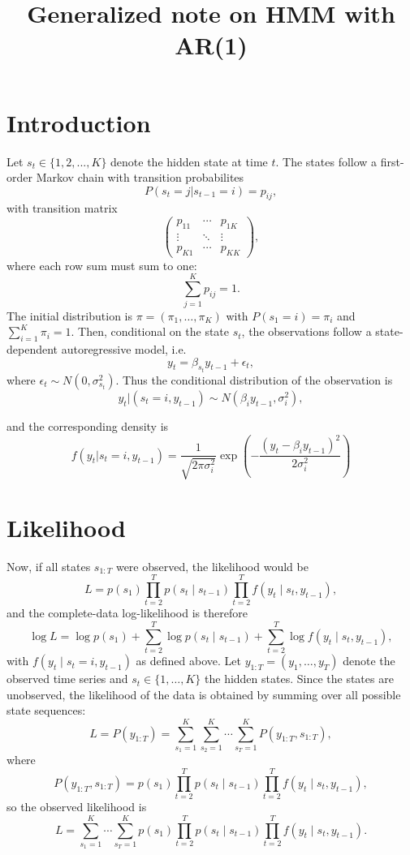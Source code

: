 \documentclass[11pt]{article}
\title{Generalized note on HMM with AR(1)}
\begin{document}
\maketitle	
\pagebreak



\section{Introduction}

Let $s_t\in \{1, 2, ..., K\}$ denote the hidden state at time $t$. The states 
follow a first-order Markov chain with transition probabilites 
$$
P(s_t=j\vert s_{t-1}=i) = p_{ij},
$$
with transition matrix
$$
\begin{pmatrix}
    p_{11} & \cdots & p_{1K}\\
    \vdots & \ddots & \vdots \\
    p_{K1} & \cdots & p_{KK}
\end{pmatrix},
$$
where each row sum must sum to one:
$$
\sum_{j=1}^K p_{ij} = 1.
$$
The initial distribution is $\pi=(\pi_1, \ldots, \pi_K)$ with $P(s_1=i)=\pi_i$
and $\sum_{i=1}^K \pi_i = 1$. Then, conditional on the state $s_t$, the observations
follow a state-dependent autoregressive model, i.e.
$$
y_t = \beta_{s_t}y_{t-1} + \epsilon_t, 
$$
where $\epsilon_t \sim N(0, \sigma^2_{s_t})$. Thus the conditional distribution of
the observation is 
$$
y_t \vert (s_t=i, y_{t-1}) \sim N(\beta_i y_{t-1}, \sigma^2_i),
$$

and the corresponding density is 
$$
f(y_t \vert s_t = i, y_{t-1}) = \frac{1}{\sqrt{2\pi \sigma^2_i}} 
\operatorname{exp}\left(- \frac{(y_t - \beta_i y_{t-1})^2}{2\sigma^2_i}\right)
$$

\section{Likelihood}
Now, if all states $s_{1:T}$ were observed, the likelihood would be
$$
L = p(s_1)\prod_{t=2}^T p(s_t \mid s_{t-1}) \prod_{t=2}^T f(y_t \mid s_t, y_{t-1}),
$$
and the complete-data log-likelihood is therefore
$$
\log L = \log p(s_1) + \sum_{t=2}^T \log p(s_t \mid s_{t-1}) + \sum_{t=2}^T \log f(y_t \mid s_t, y_{t-1}),
$$
with $f(y_t \mid s_t = i, y_{t-1})$ as defined above. Let $y_{1:T} = (y_1, \ldots, y_T)$ denote the observed time series and $s_t \in \{1, \ldots, K\}$ the hidden states. Since the states are unobserved, the likelihood of the data is obtained by summing over all possible state sequences:
$$
L = P(y_{1:T}) = \sum_{s_1=1}^K \sum_{s_2=1}^K \cdots \sum_{s_T=1}^K P(y_{1:T}, s_{1:T}),
$$
where
$$
P(y_{1:T}, s_{1:T}) = p(s_1)\prod_{t=2}^T p(s_t \mid s_{t-1}) \prod_{t=2}^T f(y_t \mid s_t, y_{t-1}),
$$
so the observed likelihood is
$$
L = \sum_{s_1=1}^K \cdots \sum_{s_T=1}^K p(s_1)\prod_{t=2}^T p(s_t \mid s_{t-1}) \prod_{t=2}^T f(y_t \mid s_t, y_{t-1}).
$$
\end{document}
